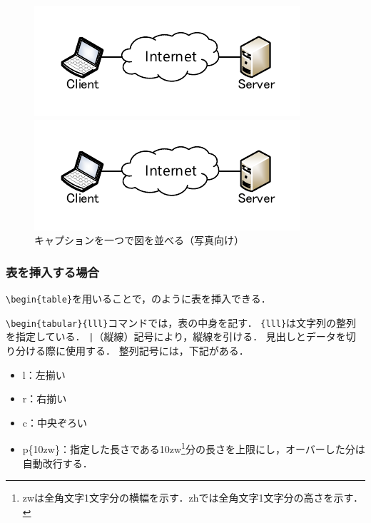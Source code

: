 \documentclass[uplatex]{jsarticle}
\begin{document}
\begin{figure}[ht]
	\centering
	\begin{minipage}[b]{0.49\textwidth}    %
		\centering
		\includegraphics[width=1 \columnwidth]{fig/figure1.pdf}
	\end{minipage}
	\begin{minipage}[b]{0.49\textwidth}
		\centering
		\includegraphics[width=1 \columnwidth]{fig/figure1.pdf}
	\end{minipage}
	\caption{キャプションを一つで図を並べる（写真向け）}
	\label{fig:figure1-3}
\end{figure}

\subsubsection{表を挿入する場合}
\verb|\begin{table}|を用いることで，のように表を挿入できる．

\verb|\begin{tabular}{lll}|コマンドでは，表の中身を記す．
\verb|{lll}|は文字列の整列を指定している．
\texttt{|}（縦線）記号により，縦線を引ける．
見出しとデータを切り分ける際に使用する．
整列記号には，下記がある．

\begin{itemize}
	\item l：左揃い
	\item r：右揃い
	\item c：中央ぞろい
	\item p\{10zw\}：指定した長さである10zw\footnote{zwは全角文字1文字分の横幅を示す．zhでは全角文字1文字分の高さを示す．}分の長さを上限にし，オーバーした分は自動改行する．
\end{itemize}
\end{document}
